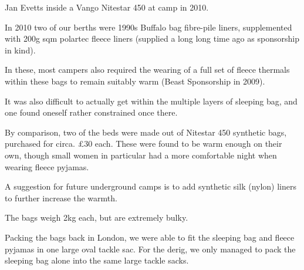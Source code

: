\begin{marginfigure}
\checkoddpage \ifoddpage \forcerectofloat \else \forceversofloat \fi
\centering
 \caption{Jan Evetts inside a Vango Nitestar 450 at camp \protect{} in 2010. }
 \label{nitestar 450}
\end{marginfigure}

In 2010 two of our berths were 1990s Buffalo bag fibre-pile liners, supplemented with 200g sqm polartec fleece liners (supplied a long long time ago as sponsorship in kind).

In these, most campers also required the wearing of a full set of fleece thermals within these bags to remain suitably warm (Beast Sponsorship in 2009).

It was also difficult to actually get within the multiple layers of sleeping bag, and one found oneself rather constrained once there.

By comparison, two of the beds were made out of Nitestar 450 synthetic bags, purchased for circa. £30 each. These were found to be warm enough on their own, though small women in particular had a more comfortable night when wearing fleece pyjamas.

A suggestion for future underground camps is to add synthetic silk (nylon) liners to further increase the warmth.

The bags weigh 2kg each, but are extremely bulky.

Packing the bags back in London, we were able to fit the sleeping bag and fleece pyjamas in one large oval tackle sac. For the derig, we only managed to pack the sleeping bag alone into the same large tackle sacks.

